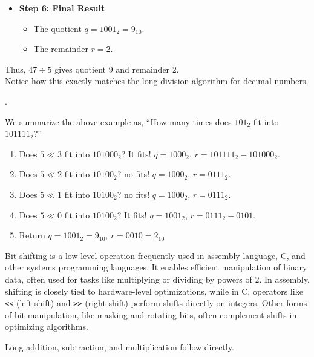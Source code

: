 \begin{itemize}
    \item \textbf{Step 6: Final Result}
    \begin{itemize}
        \item The quotient $q = 1001_2 = 9_{10}$.
        \item The remainder $r = 2$.
    \end{itemize}
\end{itemize}

\noindent
Thus, $47 \div 5$ gives quotient $9$ and remainder $2$.\\
Notice how this exactly matches the long division algorithm for decimal numbers.\\
\begin{center}
    .
\end{center}
We summarize the above example as, ``How many times does $101_2$ fit into $101111_2$?''
\begin{enumerate}
    \item  Does $5\ll 3$ fit into $101000_2$? It fits! $q=1000_2$, $r = 101111_2 - 101000_2$.
    \item  Does $5\ll 2$ fit into $10100_2$? no fits! $q=1000_2$, $r = 0111_2$.
    \item  Does $5\ll 1$ fit into $10100_2$? no fits! $q=1000_2$, $r = 0111_2$.
    \item  Does $5\ll 0$ fit into $10100_2$? It fits! $q=1001_2$, $r = 0111_2-0101$.
    \item  Return $q=1001_2=9_{10}$, $r = 0010 = 2_{10}$ 
\end{enumerate}

\begin{Tip}
    Bit shifting is a low-level operation frequently used in assembly language, C, and other systems programming languages. It enables efficient manipulation of binary data, often used for tasks like multiplying or dividing by powers of 2. In assembly, shifting is closely tied to hardware-level optimizations, while in C, operators like \texttt{<<} (left shift) and \texttt{>>} (right shift) perform shifts directly on integers. Other forms of bit manipulation, like masking and rotating bits, often complement shifts in optimizing algorithms.
\end{Tip}



\newpage 
\noindent
Long addition, subtraction, and multiplication follow directly.

